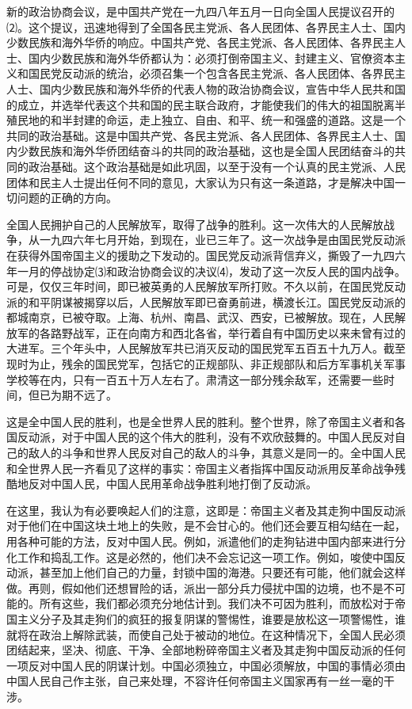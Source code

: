 \documentclass[UTF-8, a5paper, 12pt]{ctexart}
\begin{document}
新的政治协商会议，是中国共产党在一九四八年五月一日向全国人民提议召开的⑵。这个提议，迅速地得到了全国各民主党派、各人民团体、各界民主人士、国内少数民族和海外华侨的响应。中国共产党、各民主党派、各人民团体、各界民主人士、国内少数民族和海外华侨都认为：必须打倒帝国主义、封建主义、官僚资本主义和国民党反动派的统治，必须召集一个包含各民主党派、各人民团体、各界民主人士、国内少数民族和海外华侨的代表人物的政治协商会议，宣告中华人民共和国的成立，并选举代表这个共和国的民主联合政府，才能使我们的伟大的祖国脱离半殖民地的和半封建的命运，走上独立、自由、和平、统一和强盛的道路。这是一个共同的政治基础。这是中国共产党、各民主党派、各人民团体、各界民主人士、国内少数民族和海外华侨团结奋斗的共同的政治基础，这也是全国人民团结奋斗的共同的政治基础。这个政治基础是如此巩固，以至于没有一个认真的民主党派、人民团体和民主人士提出任何不同的意见，大家认为只有这一条道路，才是解决中国一切问题的正确的方向。

全国人民拥护自己的人民解放军，取得了战争的胜利。这一次伟大的人民解放战争，从一九四六年七月开始，到现在，业已三年了。这一次战争是由国民党反动派在获得外国帝国主义的援助之下发动的。国民党反动派背信弃义，撕毁了一九四六年一月的停战协定⑶和政治协商会议的决议⑷，发动了这一次反人民的国内战争。可是，仅仅三年时间，即已被英勇的人民解放军所打败。不久以前，在国民党反动派的和平阴谋被揭穿以后，人民解放军即已奋勇前进，横渡长江。国民党反动派的都城南京，已被夺取。上海、杭州、南昌、武汉、西安，已被解放。现在，人民解放军的各路野战军，正在向南方和西北各省，举行着自有中国历史以来未曾有过的大进军。三个年头中，人民解放军共已消灭反动的国民党军五百五十九万人。截至现时为止，残余的国民党军，包括它的正规部队、非正规部队和后方军事机关军事学校等在内，只有一百五十万人左右了。肃清这一部分残余敌军，还需要一些时间，但已为期不远了。

这是全中国人民的胜利，也是全世界人民的胜利。整个世界，除了帝国主义者和各国反动派，对于中国人民的这个伟大的胜利，没有不欢欣鼓舞的。中国人民反对自己的敌人的斗争和世界人民反对自己的敌人的斗争，其意义是同一的。全中国人民和全世界人民一齐看见了这样的事实：帝国主义者指挥中国反动派用反革命战争残酷地反对中国人民，中国人民用革命战争胜利地打倒了反动派。

在这里，我认为有必要唤起人们的注意，这即是：帝国主义者及其走狗中国反动派对于他们在中国这块土地上的失败，是不会甘心的。他们还会要互相勾结在一起，用各种可能的方法，反对中国人民。例如，派遣他们的走狗钻进中国内部来进行分化工作和捣乱工作。这是必然的，他们决不会忘记这一项工作。例如，唆使中国反动派，甚至加上他们自己的力量，封锁中国的海港。只要还有可能，他们就会这样做。再则，假如他们还想冒险的话，派出一部分兵力侵扰中国的边境，也不是不可能的。所有这些，我们都必须充分地估计到。我们决不可因为胜利，而放松对于帝国主义分子及其走狗们的疯狂的报复阴谋的警惕性，谁要是放松这一项警惕性，谁就将在政治上解除武装，而使自己处于被动的地位。在这种情况下，全国人民必须团结起来，坚决、彻底、干净、全部地粉碎帝国主义者及其走狗中国反动派的任何一项反对中国人民的阴谋计划。中国必须独立，中国必须解放，中国的事情必须由中国人民自己作主张，自己来处理，不容许任何帝国主义国家再有一丝一毫的干涉。
\end{document}
